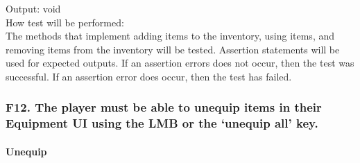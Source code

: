 \documentclass[12pt, titlepage]{article}
\begin{document}
\begin{enumerate}
{\color{magenta} Output: void}\\
					
{\color{magenta} How test will be performed:}\\{\color{magenta} The methods that implement adding items to the inventory, using items, and removing items from the inventory will be tested. Assertion statements will be used for expected outputs. If an assertion errors does not occur, then the test was successful. If an assertion error does occur, then the test has failed.} \\
\end{enumerate}

\subsubsection{{\color{magenta} F12. The player must be able to unequip items in their Equipment UI using the LMB or the `unequip all’  key.}} 

\paragraph{{\color{magenta} Unequip}}
\end{document}
